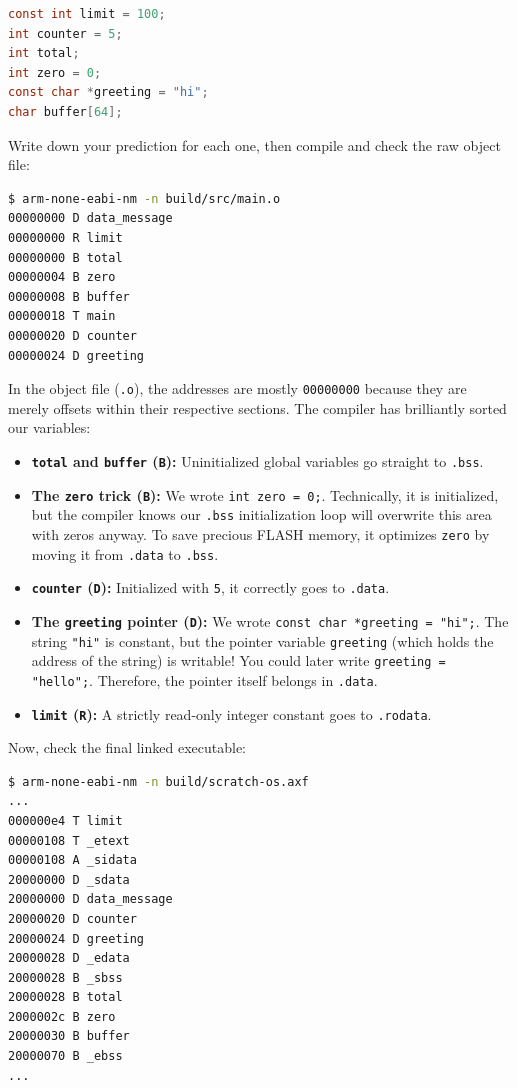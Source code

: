 \begin{lstlisting}[language=c]
const int limit = 100;
int counter = 5;
int total;
int zero = 0;
const char *greeting = "hi";
char buffer[64];
\end{lstlisting}

Write down your prediction for each one, then compile and check the raw object file:
\begin{lstlisting}[language=bash]
$ arm-none-eabi-nm -n build/src/main.o
00000000 D data_message
00000000 R limit
00000000 B total
00000004 B zero
00000008 B buffer
00000018 T main
00000020 D counter
00000024 D greeting
\end{lstlisting}

In the object file (\texttt{.o}), the addresses are mostly \texttt{00000000} because they are merely offsets within their respective sections. The compiler has brilliantly sorted our variables:
\begin{itemize}
    \item \textbf{\texttt{total} and \texttt{buffer} (\texttt{B}):} Uninitialized global variables go straight to \texttt{.bss}.
    \item \textbf{The \texttt{zero} trick (\texttt{B}):} We wrote \texttt{int zero = 0;}. Technically, it is initialized, but the compiler knows our \texttt{.bss} initialization loop will overwrite this area with zeros anyway. To save precious FLASH memory, it optimizes \texttt{zero} by moving it from \texttt{.data} to \texttt{.bss}.
    \item \textbf{\texttt{counter} (\texttt{D}):} Initialized with \texttt{5}, it correctly goes to \texttt{.data}.
    \item \textbf{The \texttt{greeting} pointer (\texttt{D}):} We wrote \texttt{const char *greeting = "hi";}. The string \texttt{"hi"} is constant, but the pointer variable \texttt{greeting} (which holds the address of the string) is writable! You could later write \texttt{greeting = "hello";}. Therefore, the pointer itself belongs in \texttt{.data}.
    \item \textbf{\texttt{limit} (\texttt{R}):} A strictly read-only integer constant goes to \texttt{.rodata}.
\end{itemize}

Now, check the final linked executable:
\begin{lstlisting}[language=bash]
$ arm-none-eabi-nm -n build/scratch-os.axf
...
000000e4 T limit
00000108 T _etext
00000108 A _sidata
20000000 D _sdata
20000000 D data_message
20000020 D counter
20000024 D greeting
20000028 D _edata
20000028 B _sbss
20000028 B total
2000002c B zero
20000030 B buffer
20000070 B _ebss
...
\end{lstlisting}

